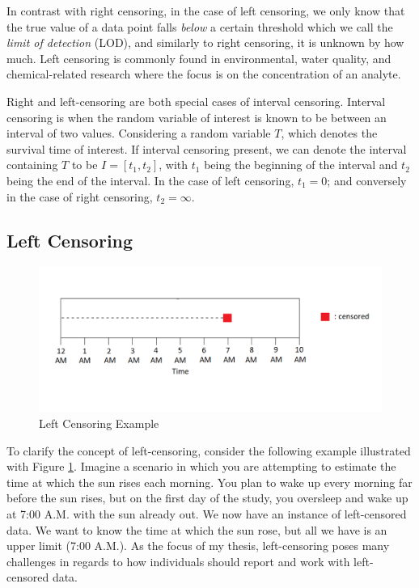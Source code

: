 \documentclass[12pt, twoside]{amherstthesis}
\begin{document}
In contrast with right censoring, in the case of left censoring, we only know that the true value of a data point falls \emph{below} a certain threshold which we call the \emph{limit of detection} (LOD), and similarly to right censoring, it is unknown by how much. Left censoring is commonly found in environmental, water quality, and chemical-related research where the focus is on the concentration of an analyte.

Right and left-censoring are both special cases of interval censoring. Interval censoring is when the random variable of interest is known to be between an interval of two values. Considering a random variable \(T\), which denotes the survival time of interest. If interval censoring present, we can denote the interval containing \(T\) to be \(I = [t_1, t_2]\), with \(t_1\) being the beginning of the interval and \(t_2\) being the end of the interval. In the case of left censoring, \(t_1 = 0\); and conversely in the case of right censoring, \(t_2 = \infty\).

\hypertarget{left}{%
\subsection{Left Censoring}\label{left}}
\begin{figure}

{\centering \includegraphics[width=1\linewidth]{figures/left_censoring_example_fix} 

}

\caption{Left Censoring Example}\label{fig:leftcensoringexample}
\end{figure}
To clarify the concept of left-censoring, consider the following example illustrated with Figure \ref{fig:leftcensoringexample}. Imagine a scenario in which you are attempting to estimate the time at which the sun rises each morning. You plan to wake up every morning far before the sun rises, but on the first day of the study, you oversleep and wake up at 7:00 A.M. with the sun already out. We now have an instance of left-censored data. We want to know the time at which the sun rose, but all we have is an upper limit (7:00 A.M.). As the focus of my thesis, left-censoring poses many challenges in regards to how individuals should report and work with left-censored data.
\end{document}
